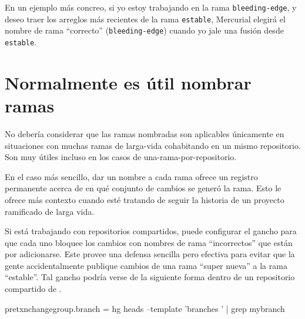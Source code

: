 En un ejemplo más concreo, si yo estoy trabajando en la rama
\texttt{bleeding-edge}, y deseo traer los arreglos más recientes de la
rama \texttt{estable}, Mercurial elegirá el nombre de rama ``correcto''
(\texttt{bleeding-edge}) cuando yo jale una fusión desde \texttt{estable}.

\section{Normalmente es útil nombrar ramas}

No debería considerar que las ramas nombradas son aplicables
únicamente en situaciones con muchas ramas de larga-vida cohabitando
en un mismo repositorio.  Son muy útiles incluso en los casos de
una-rama-por-repositorio.

En el caso más sencillo, dar un nombre a cada rama ofrece un registro
permanente acerca de en qué conjunto de cambios se generó la rama.
Esto le ofrece más contexto cuando esté tratando de seguir la
historia de un proyecto ramificado de larga vida.

Si está trabajando con repositorios compartidos, puede configurar el gancho
 para que cada uno bloquee los cambios con
nombres de rama ``incorrectos'' que están por adicionarse.  Este
provee una defensa sencilla pero efectiva para evitar que la gente
accidentalmente publique cambios de una rama ``super nueva'' a la rama
``estable''.  Tal gancho podría verse de la siguiente forma dentro de
un repositorio compartido de \hgrc.
\begin{codesample2}
  [hooks]
  pretxnchangegroup.branch = hg heads --template '{branches} ' | grep mybranch
\end{codesample2}

